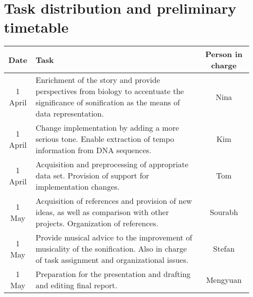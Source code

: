 \documentclass[10pt]{article}
\begin{document}
\section{Task distribution and preliminary timetable}
\begin{center}
    \begin{tabular}{ | c | p{7 cm} | c  |}
    \hline
    Date & Task  & Person in charge \\ \hline
    1 April & Enrichment of the story and provide perspectives from biology to accentuate the significance of sonification as the means of data representation. & Nina \\ \hline
    1 April &  Change implementation by adding a more serious tone. Enable extraction of tempo information from DNA sequences.  & Kim \\ \hline
    1 April & Acquisition and preprocessing of appropriate data set. Provision of support for implementation changes.              & Tom \\ \hline
    1 May & Acquisition of references and provision of new ideas, as well as comparison with other projects. Organization of references.                                               & Sourabh \\ \hline
    1 May & Provide musical advice to the improvement of musicality of the sonification. Also in charge of task assignment and organizational issues. & Stefan  \\ \hline
     1 May & Preparation for the presentation and drafting and editing final report.        & Mengyuan \\ \hline
    
    \hline
    \end{tabular}
\end{center}


\newpage
\clearpage
\thispagestyle{empty}

\nocite{*}
\printbibliography
\end{document}
